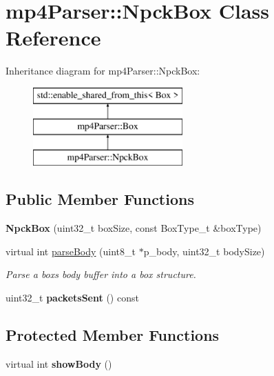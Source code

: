 \hypertarget{classmp4_parser_1_1_npck_box}{}\section{mp4\+Parser\+::Npck\+Box Class Reference}
\label{classmp4_parser_1_1_npck_box}
Inheritance diagram for mp4\+Parser\+::Npck\+Box\+:\begin{figure}[H]
\begin{center}
\leavevmode
\includegraphics[height=3.000000cm]{classmp4_parser_1_1_npck_box}
\end{center}
\end{figure}
\subsection*{Public Member Functions}
\begin{DoxyCompactItemize}
\item 
\mbox{\label{classmp4_parser_1_1_npck_box_afd40d4a46c1f3ab4e09827ea02322685}} 
{\bfseries Npck\+Box} (uint32\+\_\+t box\+Size, const Box\+Type\+\_\+t \&box\+Type)
\item 
virtual int \mbox{\hyperlink{classmp4_parser_1_1_npck_box_abd131fd0a9473b8f7b79500a588cc8a4}{parse\+Body}} (uint8\+\_\+t $\ast$p\+\_\+body, uint32\+\_\+t body\+Size)
\begin{DoxyCompactList}\small\item\em Parse a box\textquotesingle{}s body buffer into a box structure. \end{DoxyCompactList}\item 
\mbox{\label{classmp4_parser_1_1_npck_box_a4e38bb54a18507982a1969ebe3dc0e4a}} 
uint32\+\_\+t {\bfseries packets\+Sent} () const
\end{DoxyCompactItemize}
\subsection*{Protected Member Functions}
\begin{DoxyCompactItemize}
\item 
\mbox{\label{classmp4_parser_1_1_npck_box_ac13c26e97587a463ee70bc1b0861f99c}} 
virtual int {\bfseries show\+Body} ()
\end{DoxyCompactItemize}
